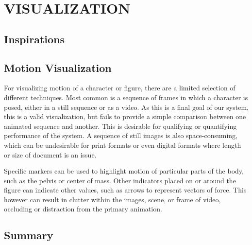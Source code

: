 
 
\chapter{VISUALIZATION}
\label{chapter:visualization}

\section{Inspirations}
\label{section:vis_insp}


\section{Motion Visualization}
\label{section:motion_vis}
For visualizing motion of a character or figure, there are a limited selection of different techniques.  Most common is a sequence of frames in which a character is posed, either in a still sequence or as a video.  As this is a final goal of our system, this is a valid visualization, but fails to provide a simple comparison between one animated sequence and another.  This is desirable for qualifying or quantifying performance of the system.  A sequence of still images is also space-consuming, which can be undesirable for print formats or even digital formats where length or size of document is an issue.

Specific markers can be used to highlight motion of particular parts of the body, such as the pelvis or center of mass.  Other indicators placed on or around the figure can indicate other values, such as arrows to represent vectors of force.  This however can result in clutter within the images, scene, or frame of video, occluding or distraction from the primary animation.

\section{Summary}
\label{section:vis_summary}
